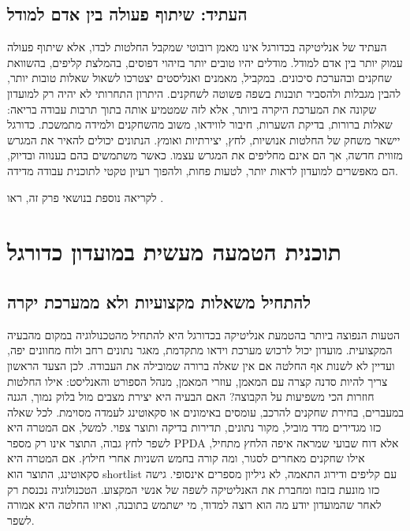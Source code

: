 \documentclass[11pt]{report}
\begin{document}
\section{העתיד: שיתוף פעולה בין אדם למודל}
העתיד של אנליטיקה בכדורגל אינו מאמן רובוטי שמקבל החלטות לבדו, אלא שיתוף פעולה עמוק יותר בין אדם למודל. מודלים יהיו טובים יותר בזיהוי דפוסים, בהמלצת קליפים, בהשוואת שחקנים ובהערכת סיכונים. במקביל, מאמנים ואנליסטים יצטרכו לשאול שאלות טובות יותר, להבין מגבלות ולהסביר תובנות בשפה פשוטה לשחקנים. היתרון התחרותי לא יהיה רק למועדון שקונה את המערכת היקרה ביותר, אלא לזה שמטמיע אותה בתוך תרבות עבודה בריאה: שאלות ברורות, בדיקת השערות, חיבור לווידאו, משוב מהשחקנים ולמידה מתמשכת. כדורגל יישאר משחק של החלטות אנושיות, לחץ, יצירתיות ואומץ. הנתונים יכולים להאיר את המגרש מזווית חדשה, אך הם אינם מחליפים את המגרש עצמו. כאשר משתמשים בהם בענווה ובדיוק, הם מאפשרים למועדון לראות יותר, לטעות פחות, ולהפוך רעיון טקטי לתוכנית עבודה מדידה.

לקריאה נוספת בנושאי פרק זה, ראו \cite{latex_project}.

\chapter{תוכנית הטמעה מעשית במועדון כדורגל}
\section{להתחיל משאלות מקצועיות ולא ממערכת יקרה}
הטעות הנפוצה ביותר בהטמעת אנליטיקה בכדורגל היא להתחיל מהטכנולוגיה במקום מהבעיה המקצועית. מועדון יכול לרכוש מערכת וידאו מתקדמת, מאגר נתונים רחב ולוח מחוונים יפה, ועדיין לא לשנות אף החלטה אם אין שאלה ברורה שמובילה את העבודה. לכן הצעד הראשון צריך להיות סדנה קצרה עם המאמן, עוזרי המאמן, מנהל הספורט והאנליסט: אילו החלטות חוזרות הכי משפיעות על הקבוצה? האם הבעיה היא יצירת מצבים מול בלוק נמוך, הגנה במעברים, בחירת שחקנים להרכב, עומסים באימונים או סקאוטינג לעמדה מסוימת. לכל שאלה כזו מגדירים מדד מוביל, מקור נתונים, תדירות בדיקה ותוצר צפוי. למשל, אם המטרה היא לשפר לחץ גבוה, התוצר אינו רק מספר PPDA אלא דוח שבועי שמראה איפה הלחץ מתחיל, אילו שחקנים מאחרים לסגור, ומה קורה בחמש השניות אחרי חילוץ. אם המטרה היא סקאוטינג, התוצר הוא shortlist עם קליפים ודירוג התאמה, לא גיליון מספרים אינסופי. גישה כזו מונעת בזבוז ומחברת את האנליטיקה לשפה של אנשי המקצוע. הטכנולוגיה נכנסת רק לאחר שהמועדון יודע מה הוא רוצה למדוד, מי ישתמש בתובנה, ואיזו החלטה היא אמורה לשפר.
\end{document}
